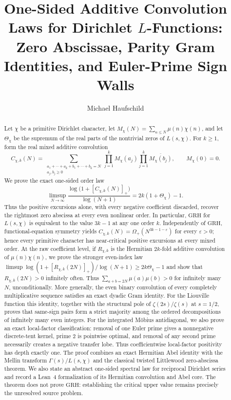 \documentclass[11pt]{article}
\title{One-Sided Additive Convolution Laws for Dirichlet \(L\)-Functions:\\
Zero Abscissae, Parity Gram Identities, and Euler-Prime Sign Walls}
\author{Michael Haufschild}
\date{}
\theoremstyle{remark}
\newcommand{\GRH}{\mathrm{GRH}}
\newcommand{\eps}{\varepsilon}
\begin{document}
\maketitle

\begin{abstract}
Let $\chi$ be a primitive Dirichlet character, let
$M_\chi(N)=\sum_{n\leq N}\mu(n)\chi(n)$, and let $\Theta_\chi$ be the supremum of
the real parts of the nontrivial zeros of $L(s,\chi)$.  For $k\geq1$, form the real
mixed additive convolution
\[
 C_{\chi,k}(N)=
 \sum_{\substack{a_1+\cdots+a_k+b_1+\cdots+b_k=N\\a_j,b_j\geq0}}
 \prod_{j=1}^k M_\chi(a_j)
 \prod_{j=1}^k \overline{M_\chi(b_j)},
 \qquad M_\chi(0)=0.
\]
We prove the exact one-sided order law
\[
 \limsup_{N\to\infty}
 \frac{\log\bigl(1+[C_{\chi,k}(N)]_+\bigr)}{\log(N+1)}
 =2k(1+\Theta_\chi)-1.
\]
Thus the positive excursions alone, with every negative coefficient discarded, recover the
rightmost zero abscissa at every even nonlinear order.  In particular, $\GRH$ for
$L(s,\chi)$ is equivalent to the value $3k-1$ at any one order $k$.  Independently of
$\GRH$, functional-equation symmetry yields
$C_{\chi,k}(N)=\Omega_+(N^{3k-1-\eps})$ for every $\eps>0$; hence every primitive
character has near-critical positive excursions at every mixed order.  At the raw coefficient
level, if $R_{\chi,k}$ is the Hermitian $2k$-fold additive convolution of
$\mu(n)\chi(n)$, we prove the stronger even-index law
$\limsup \log(1+[R_{\chi,k}(2N)]_+)/\log(N+1)\geq2k\Theta_\chi-1$ and show that
$R_{\chi,k}(2N)>0$ infinitely often.  Thus
$\sum_{a+b=2N}\mu(a)\mu(b)>0$ for infinitely many $N$, unconditionally.  More generally, the
even binary convolution of every completely multiplicative sequence satisfies an exact dyadic
Gram identity.  For the Liouville function this identity, together with the structural pole of
$\zeta(2s)/\zeta(s)$ at $s=1/2$, proves that same-sign pairs form a strict majority among the
ordered decompositions of infinitely many even integers.  For the integrated M\"obius
antidiagonal, we also prove an exact local-factor classification: removal of one Euler prime gives
a nonnegative discrete-tent kernel, prime $2$ is pointwise optimal, and removal of any second
prime necessarily creates a negative transfer lobe.  Thus coefficientwise local-factor positivity
has depth exactly one.  The proof combines an
exact Hermitian Abel identity with the Mellin transform
$\Gamma(s)/L(s,\chi)$ and the classical twisted Littlewood zero-abscissa theorem.  We also
state an abstract one-sided spectral law for reciprocal Dirichlet series and record a Lean~4
formalization of its Hermitian convolution and Abel core.  The theorem does not prove $\GRH$:
establishing the critical upper value remains precisely the unresolved source problem.
\end{abstract}
\end{document}
